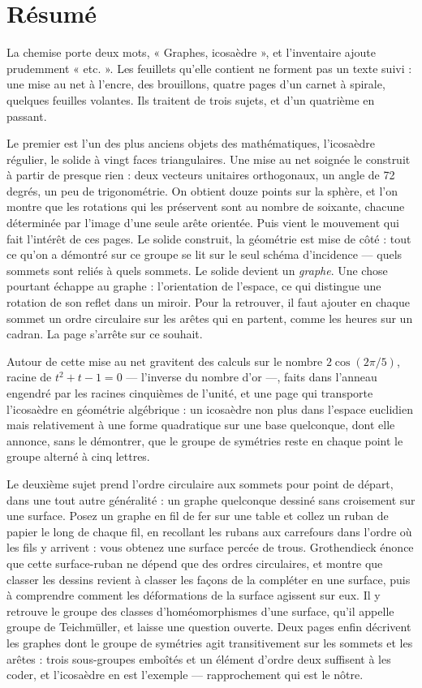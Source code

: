 \documentclass[11pt,a4paper]{article}
\begin{document}
\section*{Résumé}

\begin{resume}
La chemise porte deux mots, « Graphes, icosaèdre », et l'inventaire ajoute
prudemment « etc. ». Les feuillets qu'elle contient ne forment pas un texte
suivi : une mise au net à l'encre, des brouillons, quatre pages d'un carnet à
spirale, quelques feuilles volantes. Ils traitent de trois sujets, et d'un
quatrième en passant.

Le premier est l'un des plus anciens objets des mathématiques, l'icosaèdre
régulier, le solide à vingt faces triangulaires. Une mise au net soignée le
construit à partir de presque rien : deux vecteurs unitaires orthogonaux, un
angle de 72 degrés, un peu de trigonométrie. On obtient douze points sur la
sphère, et l'on montre que les rotations qui les préservent sont au nombre de
soixante, chacune déterminée par l'image d'une seule arête orientée. Puis
vient le mouvement qui fait l'intérêt de ces pages. Le solide construit, la
géométrie est mise de côté : tout ce qu'on a démontré sur ce groupe se lit sur
le seul schéma d'incidence --- quels sommets sont reliés à quels sommets. Le
solide devient un \emph{graphe}. Une chose pourtant échappe au graphe :
l'orientation de l'espace, ce qui distingue une rotation de son reflet dans un
miroir. Pour la retrouver, il faut ajouter en chaque sommet un ordre
circulaire sur les arêtes qui en partent, comme les heures sur un cadran. La
page s'arrête sur ce souhait.

Autour de cette mise au net gravitent des calculs sur le nombre
$2\cos(2\pi/5)$, racine de $t^{2} + t - 1 = 0$ --- l'inverse du nombre d'or ---,
faits dans l'anneau engendré par les racines cinquièmes de l'unité, et une
page qui transporte l'icosaèdre en géométrie algébrique : un icosaèdre non
plus dans l'espace euclidien mais relativement à une forme quadratique sur une
base quelconque, dont elle annonce, sans le démontrer, que le groupe de
symétries reste en chaque point le groupe alterné à cinq lettres.

Le deuxième sujet prend l'ordre circulaire aux sommets pour point de départ,
dans une tout autre généralité : un graphe quelconque dessiné sans croisement
sur une surface. Posez un graphe en fil de fer sur une table et collez un
ruban de papier le long de chaque fil, en recollant les rubans aux carrefours
dans l'ordre où les fils y arrivent : vous obtenez une surface percée de
trous. Grothendieck énonce que cette surface-ruban ne dépend que des ordres
circulaires, et montre que classer les dessins revient à classer les façons de la
compléter en une surface, puis à comprendre comment les déformations de la
surface agissent sur eux. Il y retrouve le groupe des classes
d'homéomorphismes d'une surface, qu'il appelle groupe de Teichmüller, et
laisse une question ouverte. Deux pages enfin décrivent les graphes dont le
groupe de symétries agit transitivement sur les sommets et les arêtes : trois
sous-groupes emboîtés et un élément d'ordre deux suffisent à les coder, et
l'icosaèdre en est l'exemple --- rapprochement qui est le nôtre.


\end{resume}
\end{document}
